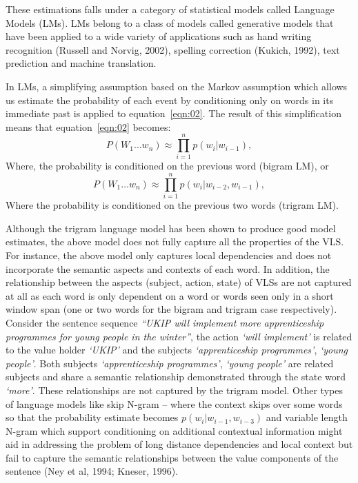 These estimations falls under a category of statistical models called Language Models (LMs). LMs belong to a class of models called generative models that have been applied to a wide variety of applications such as hand writing recognition (Russell and Norvig, 2002), spelling correction (Kukich, 1992), text prediction and machine translation. 

In LMs, a simplifying assumption based on the Markov assumption which allows us estimate the probability of each event by conditioning only on words in its immediate past is applied to equation~\ref{eqn:02}. The result of this simplification means that equation~\ref{eqn:02} becomes: 
\begin{equation}
\label{eqn:03}
P(W_1 \ldots w_n) \approx \prod_{i=1}^{n}p(w_i|w_{i-1}),
\end{equation}
Where, the probability is conditioned on the previous word (bigram LM), or
\begin{equation}
\label{eqn:04}
P(W_1 \ldots w_n) \approx \prod_{i=1}^{n}p(w_i|w_{i-2},w_{i-1}),
\end{equation}
Where the probability is conditioned on the previous two words (trigram LM).


Although the trigram language model has been shown to produce good model estimates, the above model does not fully capture all the properties of the VLS. For instance, the above model only captures local dependencies and does not incorporate the semantic aspects and contexts of each word. In addition, the relationship between the aspects (subject, action, state) of VLSs are not captured at all as each word is only dependent on a word or words seen only in a short window span (one or two words for the bigram and trigram case respectively). Consider the sentence sequence \textit{``UKIP will implement more apprenticeship programmes for young people in the winter''}, the action \textit{`will implement'} is related to the value holder \textit{`UKIP'} and the subjects \textit{`apprenticeship programmes'}, \textit{`young people'}. Both subjects \textit{`apprenticeship programmes'}, \textit{`young people'} are related subjects and share a semantic relationship demonstrated through the state word \textit{`more'}. These relationships are not captured by the trigram model. Other types of language models like skip N-gram  -- where the context skips over some words so that the probability estimate becomes $p(w_i|w_{i-1},w_{i-3})$ and variable length N-gram which support conditioning on additional contextual information might aid in addressing the problem of long distance dependencies and local context but fail to capture the semantic relationships between the value components of the sentence (Ney et al, 1994; Kneser, 1996). 

